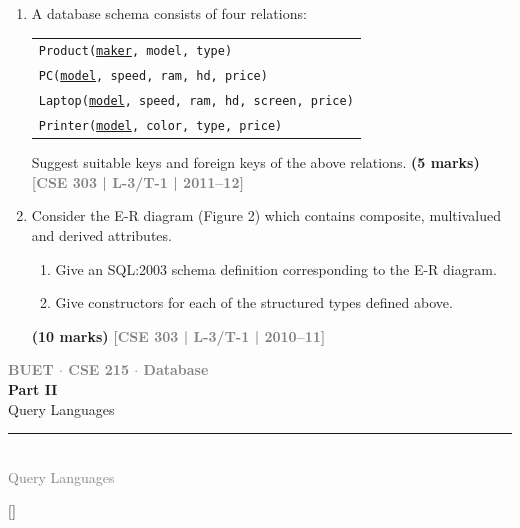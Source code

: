 \documentclass[12pt]{article}
\newcommand{\yr}[1]{\hfill\textcolor{gray}{\small\textbf{[#1]}}}
\newcommand{\mk}[1]{\textcolor{orange!70!black}{\small\textbf{(#1 marks)}}}
\newcommand{\secdivider}[4]{%
  \newpage\thispagestyle{empty}%
  \vspace*{\fill}%
  \begin{tcolorbox}[enhanced,colback=#4!7,colframe=#3,boxrule=1.5pt,arc=8pt,
    left=20pt,right=20pt,top=22pt,bottom=22pt,
    shadow={3pt}{-3pt}{0pt}{black!15}]
    \centering
    {\large\textcolor{gray}{\textbf{BUET $\cdot$ CSE 215 $\cdot$ Database}}}\\[8pt]
    {\fontsize{26}{32}\selectfont\bfseries\textcolor{#3}{#1}}\\[6pt]
    {\fontsize{15}{19}\selectfont\textcolor{dgray}{#2}}\\[12pt]
    \textcolor{#3!60}{\rule{0.5\textwidth}{0.5pt}}\\[6pt]
    {\small\textcolor{gray}{#2}}
  \end{tcolorbox}%
  \vspace*{\fill}\newpage%
}
\begin{document}
\begin{enumerate}
\begin{center}
\end{center}


\mk{15} \yr{CSE 303 | L-3/T-1 | 2012--13}


\item A database schema consists of four relations:
\begin{center}
\begin{tabular}{l}
\texttt{Product(\underline{maker}, model, type)}\\
\texttt{PC(\underline{model}, speed, ram, hd, price)}\\
\texttt{Laptop(\underline{model}, speed, ram, hd, screen, price)}\\
\texttt{Printer(\underline{model}, color, type, price)}
\end{tabular}
\end{center}
Suggest suitable keys and foreign keys of the above relations.
\mk{5} \yr{CSE 303 | L-3/T-1 | 2011--12}


\item Consider the E-R diagram (Figure 2) which contains composite, multivalued and derived attributes.
\begin{enumerate}
  \item Give an SQL:2003 schema definition corresponding to the E-R diagram.
  \item Give constructors for each of the structured types defined above.
\end{enumerate}
\mk{10} \yr{CSE 303 | L-3/T-1 | 2010--11}


\end{enumerate}


\secdivider{Part II}{Query Languages}{cB}{cB}
\titleformat{\section}{\large\bfseries\color{cB}}{}{0em}{}[\titlerule]
\end{document}
